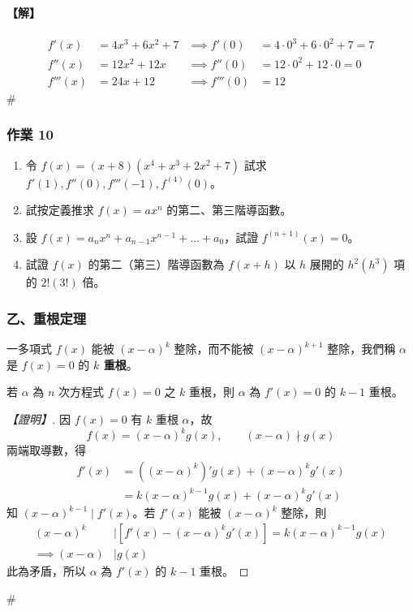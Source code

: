 \paragraph{【解】}
\begin{align*}
f'(x) &= 4x^3+6x^2+7 &\implies f'(0) &= 4 \cdot 0^3 + 6 \cdot 0^2 + 7 = 7 \\
f''(x) &= 12x^2+12x &\implies f''(0) &= 12 \cdot 0^2 + 12 \cdot 0 = 0 \\
f'''(x) &= 24x+12 &\implies f'''(0) &= 12
\end{align*}
\hfill$\#$

\subsubsection*{作業 10}\label{hw:b6-2-10}
\begin{enumerate}[label=(\roman*), leftmargin=2em]
  \item 令 $f(x)=(x+8)(x^4+x^3+2x^2+7)$ 試求 $f'(1), f''(0), f'''(-1), f^{(4)}(0)$。
  \item 試按定義推求 $f(x)=ax^n$ 的第二、第三階導函數。
  \item 設 $f(x)=a_n x^n + a_{n-1} x^{n-1} + \dots + a_0$，試證 $f^{(n+1)}(x) = 0$。
  \item 試證 $f(x)$ 的第二（第三）階導函數為 $f(x+h)$ 以 $h$ 展開的 $h^2(h^3)$ 項的 $2!(3!)$ 倍。
\end{enumerate}

\subsubsection*{乙、重根定理}\label{subsec:b6-2-4-b}

一多項式 $f(x)$ 能被 $(x-\alpha)^k$ 整除，而不能被 $(x-\alpha)^{k+1}$ 整除，我們稱 $\alpha$ 是 $f(x)=0$ 的 \textbf{$k$ 重根}。

\begin{theorem}[重根定理]\label{thm:b6-2-multiple-root}
若 $\alpha$ 為 $n$ 次方程式 $f(x)=0$ 之 $k$ 重根，則 $\alpha$ 為 $f'(x)=0$ 的 $k-1$ 重根。
\end{theorem}

\begin{proof}[【證明】]
因 $f(x)=0$ 有 $k$ 重根 $\alpha$，故
\[ f(x) = (x-\alpha)^k g(x), \qquad (x-\alpha) \nmid g(x) \]
兩端取導數，得
\begin{align*}
f'(x) &= ((x-\alpha)^k)' g(x) + (x-\alpha)^k g'(x) \\
&= k(x-\alpha)^{k-1} g(x) + (x-\alpha)^k g'(x)
\end{align*}
知 $(x-\alpha)^{k-1} \mid f'(x)$。若 $f'(x)$ 能被 $(x-\alpha)^k$ 整除，則
\begin{align*}
(x-\alpha)^k &\mid [f'(x) - (x-\alpha)^k g'(x)] = k(x-\alpha)^{k-1} g(x) \\
\implies (x-\alpha) &\mid g(x)
\end{align*}
此為矛盾，所以 $\alpha$ 為 $f'(x)$ 的 $k-1$ 重根。
\end{proof}\hfill$\#$

